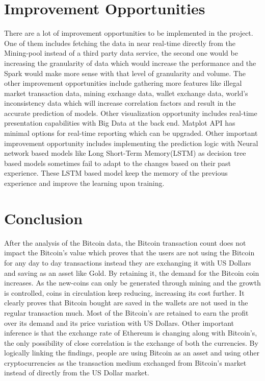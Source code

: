 \documentclass[sigconf]{acmart}
\begin{document}
\section{Improvement Opportunities}
There are a lot of improvement opportunities to be implemented in the project. One of them includes fetching the data in near real-time directly from the Mining-pool instead of a third party data service, the second one would be increasing the granularity of data which would increase the performance and the Spark would make more sense with that level of granularity and volume. The other improvement opportunities include gathering more features like illegal market transaction data, mining exchange data, wallet exchange data, world's inconsistency data which will increase correlation factors and result in the accurate prediction of models. Other visualization opportunity includes real-time presentation capabilities with Big Data at the back end. Matplot API has minimal options for real-time reporting which can be upgraded.
Other important improvement opportunity includes implementing the prediction logic with Neural network based models like Long Short-Term Memory(LSTM) as decision tree based models sometimes fail to adapt to the changes based on their past experience. These LSTM based model keep the memory of the previous experience and improve the learning upon training.

\section{Conclusion}
After the analysis of the Bitcoin data, the Bitcoin transaction count does not impact the Bitcoin's value which proves that the users are not using the Bitcoin for any day to day transactions instead they are exchanging it with US Dollars and saving as an asset like Gold. By retaining it, the demand for the Bitcoin coin increases. As the new-coins can only be generated through mining and the growth is controlled, coins in circulation keep reducing, increasing its cost further. It clearly proves that Bitcoin bought are saved in the wallets are not used in the regular transaction much. Most of the Bitcoin's are retained to earn the profit over its demand and its price variation with US Dollars. Other important inference is that the exchange rate of Ethereum is changing along with Bitcoin's, the only possibility of close correlation is the exchange of both the currencies. By logically linking the findings, people are using Bitcoin as an asset and using other cryptocurrencies as the transaction medium exchanged from Bitcoin's market instead of directly from the US Dollar market.
\end{document}
